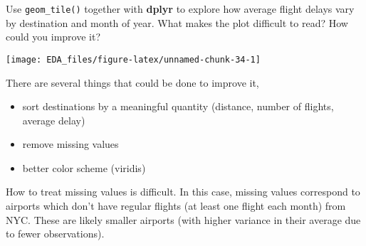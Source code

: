 \documentclass[]{book}
\newenvironment{Shaded}{\begin{snugshade}}{\end{snugshade}}
\newcommand{\DataTypeTok}[1]{\textcolor[rgb]{0.13,0.29,0.53}{#1}}
\newcommand{\KeywordTok}[1]{\textcolor[rgb]{0.13,0.29,0.53}{\textbf{#1}}}
\newcommand{\NormalTok}[1]{#1}
\newcommand{\OperatorTok}[1]{\textcolor[rgb]{0.81,0.36,0.00}{\textbf{#1}}}
\newcommand{\OtherTok}[1]{\textcolor[rgb]{0.56,0.35,0.01}{#1}}
\newcommand{\StringTok}[1]{\textcolor[rgb]{0.31,0.60,0.02}{#1}}
\providecommand{\tightlist}{%
  \setlength{\itemsep}{0pt}\setlength{\parskip}{0pt}}
\theoremstyle{plain}
\theoremstyle{remark}
\begin{document}
Use \texttt{geom\_tile()} together with \textbf{dplyr} to explore how
average flight delays vary by destination and month of year. What makes
the plot difficult to read? How could you improve it?

\begin{Shaded}
\end{Shaded}

\begin{center}\texttt{[image: EDA\_files/figure-latex/unnamed-chunk-34-1]} \end{center}

There are several things that could be done to improve it,

\begin{itemize}
\tightlist
\item
  sort destinations by a meaningful quantity (distance, number of
  flights, average delay)
\item
  remove missing values
\item
  better color scheme (viridis)
\end{itemize}

How to treat missing values is difficult. In this case, missing values
correspond to airports which don't have regular flights (at least one
flight each month) from NYC. These are likely smaller airports (with
higher variance in their average due to fewer observations).
\end{document}
